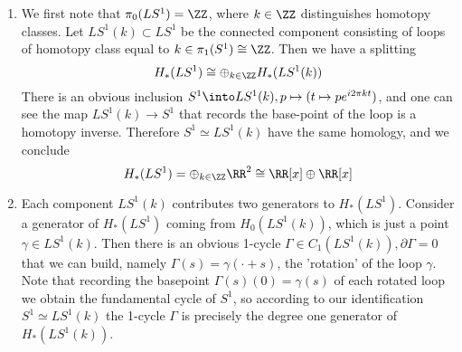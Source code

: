 \begin{enumerate}
    \item We first note that  $\pi_0(LS^1)=\ZZ$, where $k\in \ZZ$ distinguishes homotopy classes. Let $LS^1(k)\subset LS^1$ be the connected component consisting of loops of homotopy class equal to $k\in\pi_1(S^1)\cong\ZZ$. Then we have a splitting
    \[    H_*(LS^1)\cong\oplus_{k\in \ZZ}H_*(LS^1(k))\]
    There is an obvious inclusion $S^1\into LS^1(k), p\mapsto (t\mapsto pe^{i2\pi k t})$, and one can see the map $LS^1(k)\to S^1$ that records the base-point of the loop is a homotopy inverse. Therefore $S^1\simeq LS^1(k)$ have the same homology, and we conclude
    \[    H_*(LS^1)=\oplus_{k\in \ZZ} \RR^2\cong \RR[x]\oplus\RR[x]\]
    \item Each component $LS^1(k)$ contributes two generators to $H_*(LS^1)$. Consider a generator of $H_*(LS^1)$ coming from  $H_0(LS^1(k))$, which is just a point $\gamma\in LS^1(k)$. Then there is an obvious 1-cycle $\Gamma\in C_1(LS^1(k)), \partial\Gamma=0$ that we can build, namely  $\Gamma(s)=\gamma(\cdot+s)$, the 'rotation' of the loop $\gamma$. Note that recording the basepoint $\Gamma(s)(0)=\gamma(s)$ of each rotated loop we obtain the fundamental cycle of $S^1$, so according to our identification $S^1\simeq LS^1(k)$ the 1-cycle $\Gamma$ is precisely the degree one generator of $H_*(LS^1(k))$.
\end{enumerate}